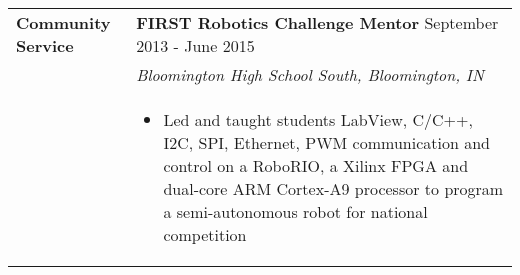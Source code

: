\begin{tabular}{L{\hlcolw}  L{\rcolw}}
\textbf{\Large Community Service} & \textbf{\large FIRST Robotics Challenge Mentor } \hfill {\large September 2013 - June 2015}  \\
 & \textit{\large Bloomington High School South, Bloomington, IN} \vspace{0.05in}  \\
& 
\vspace{-0.2in} 
\begin{itemize}[leftmargin = \itemmargin]
	\item Led and taught students LabView, C/C++, I2C, SPI, Ethernet, PWM communication and control on a RoboRIO, a Xilinx FPGA and dual-core ARM Cortex-A9 processor to program a semi-autonomous robot for national competition
\end{itemize} \\

	\hline \hline
\end{tabular}